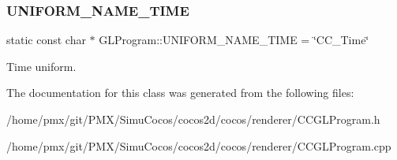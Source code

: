 \subsubsection{\texorpdfstring{U\+N\+I\+F\+O\+R\+M\+\_\+\+N\+A\+M\+E\+\_\+\+T\+I\+ME}{UNIFORM\_NAME\_TIME}}
{\footnotesize\ttfamily static const char $\ast$ G\+L\+Program\+::\+U\+N\+I\+F\+O\+R\+M\+\_\+\+N\+A\+M\+E\+\_\+\+T\+I\+ME = \char`\"{}C\+C\+\_\+\+Time\char`\"{}\hspace{0.3cm}{\ttfamily [static]}}

Time uniform. 

The documentation for this class was generated from the following files\+:\begin{DoxyCompactItemize}
\item 
/home/pmx/git/\+P\+M\+X/\+Simu\+Cocos/cocos2d/cocos/renderer/C\+C\+G\+L\+Program.\+h\item 
/home/pmx/git/\+P\+M\+X/\+Simu\+Cocos/cocos2d/cocos/renderer/C\+C\+G\+L\+Program.\+cpp\end{DoxyCompactItemize}
